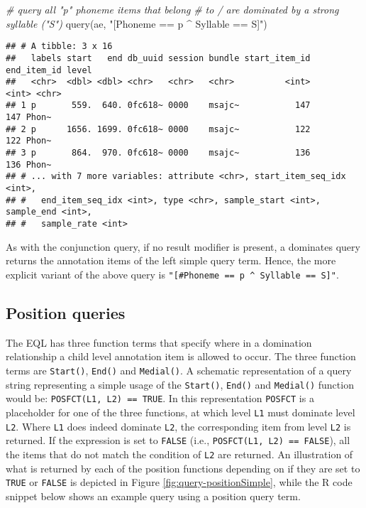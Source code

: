 \documentclass[
]{book}
\newenvironment{Shaded}{\begin{snugshade}}{\end{snugshade}}
\newcommand{\CommentTok}[1]{\textcolor[rgb]{0.56,0.35,0.01}{\textit{#1}}}
\newcommand{\FunctionTok}[1]{\textcolor[rgb]{0.00,0.00,0.00}{#1}}
\newcommand{\NormalTok}[1]{#1}
\newcommand{\StringTok}[1]{\textcolor[rgb]{0.31,0.60,0.02}{#1}}
\begin{document}
\begin{Shaded}
\begin{Highlighting}[]
\CommentTok{\# query all "p" phoneme items that belong}
\CommentTok{\# to / are dominated by a strong syllable ("S")}
\FunctionTok{query}\NormalTok{(ae, }\StringTok{"[Phoneme == p \^{} Syllable == S]"}\NormalTok{)}
\end{Highlighting}
\end{Shaded}

\begin{verbatim}
## # A tibble: 3 x 16
##   labels start   end db_uuid session bundle start_item_id end_item_id level
##   <chr>  <dbl> <dbl> <chr>   <chr>   <chr>          <int>       <int> <chr>
## 1 p       559.  640. 0fc618~ 0000    msajc~           147         147 Phon~
## 2 p      1656. 1699. 0fc618~ 0000    msajc~           122         122 Phon~
## 3 p       864.  970. 0fc618~ 0000    msajc~           136         136 Phon~
## # ... with 7 more variables: attribute <chr>, start_item_seq_idx <int>,
## #   end_item_seq_idx <int>, type <chr>, sample_start <int>, sample_end <int>,
## #   sample_rate <int>
\end{verbatim}

As with the conjunction query, if no result modifier is present, a dominates query returns the annotation items of the left simple query term. Hence, the more explicit variant of the above query is \texttt{"{[}\#Phoneme\ ==\ p\ \^{}\ Syllable\ ==\ S{]}"}.

\hypertarget{subsec:query-positionQueries}{%
\subsection{Position queries}\label{subsec:query-positionQueries}}

The EQL has three function terms that specify where in a domination relationship a child level annotation item is allowed to occur. The three function terms are \texttt{Start()}, \texttt{End()} and \texttt{Medial()}. A schematic representation of a query string representing a simple usage of the \texttt{Start()}, \texttt{End()} and \texttt{Medial()} function would be: \texttt{POSFCT(L1,\ L2)\ ==\ TRUE}. In this representation \texttt{POSFCT} is a placeholder for one of the three functions, at which level \texttt{L1} must dominate level \texttt{L2}. Where \texttt{L1} does indeed dominate \texttt{L2}, the corresponding item from level \texttt{L2} is returned. If the expression is set to \texttt{FALSE} (i.e., \texttt{POSFCT(L1,\ L2)\ ==\ FALSE}), all the items that do not match the condition of \texttt{L2} are returned. An illustration of what is returned by each of the position functions depending on if they are set to \texttt{TRUE} or \texttt{FALSE} is depicted in Figure \ref{fig:query-positionSimple}, while the R code snippet below shows an example query using a position query term.
\end{document}
